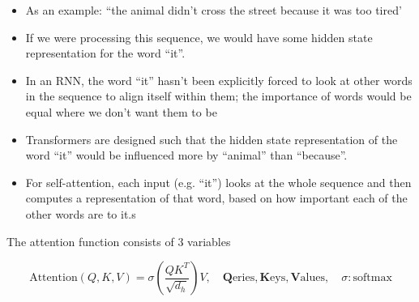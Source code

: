\documentclass[11pt]{article}
\begin{document}
\begin{minipage}[r]{.45\linewidth}
    \begin{itemize}
        \item As an example: ``the animal didn't cross the street because it was too tired'
        \item If we were processing this sequence, we would have some hidden state representation for the word ``it''.
        \item In an RNN, the word ``it'' hasn't been explicitly forced to look at other words in the sequence to align itself within them; the importance of words would be equal where we don't want them to be
        \item Transformers are designed such that the hidden state representation of the word ``it'' would be influenced more by ``animal'' than ``because''.
        \item For self-attention, each input (e.g. ``it'') looks at the whole sequence and then computes a representation of that word, based on how important each of the other words are to it.s
    \end{itemize}
\end{minipage}

The attention function consists of 3 variables

\begin{equation}
    \text{Attention}(Q,K,V)=\sigma(\frac{QK^T}{\sqrt{d_h}})V,\quad \textbf{Q}\text{eries},\textbf{K}\text{eys}, \textbf{V}\text{alues}, \quad \sigma: \text{softmax}
\end{equation}
\end{document}
